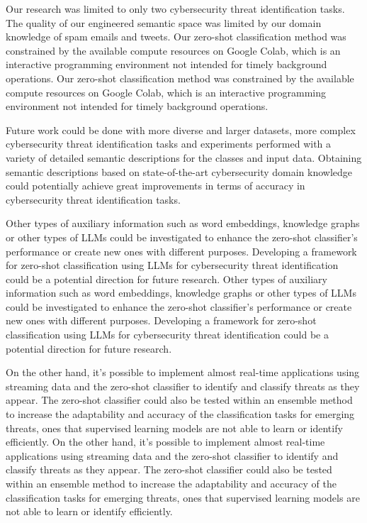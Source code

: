 \documentclass[letterpaper,twocolumn,fleqn]{article}
\begin{document}
Our research was limited to only two cybersecurity threat identification tasks. The quality of our engineered semantic space was limited by our domain knowledge of spam emails and tweets. 
Our zero-shot classification method was constrained by the available compute resources on Google Colab, which is an interactive programming environment not intended for timely background operations. 
Our zero-shot classification method was constrained by the available compute resources on Google Colab, which is an interactive programming environment not intended for timely background operations. 

Future work could be done with more diverse and larger datasets, more complex cybersecurity threat identification tasks and experiments performed with a variety of detailed semantic descriptions for the classes and input data. Obtaining semantic descriptions based on state-of-the-art cybersecurity domain knowledge could potentially achieve great improvements in terms of accuracy in cybersecurity threat identification tasks.

Other types of auxiliary information such as word embeddings, knowledge graphs or other types of LLMs could be investigated to enhance the zero-shot classifier's performance or create new ones with different purposes. Developing a framework for zero-shot classification using LLMs for cybersecurity threat identification could be a potential direction for future research.
Other types of auxiliary information such as word embeddings, knowledge graphs or other types of LLMs could be investigated to enhance the zero-shot classifier's performance or create new ones with different purposes. Developing a framework for zero-shot classification using LLMs for cybersecurity threat identification could be a potential direction for future research.

On the other hand, it's possible to implement almost real-time applications using streaming data and the zero-shot classifier to identify and classify threats as they appear. The zero-shot classifier could also be tested within an ensemble method to increase the adaptability and accuracy of the classification tasks for emerging threats, ones that supervised learning models are not able to learn or identify efficiently.
On the other hand, it's possible to implement almost real-time applications using streaming data and the zero-shot classifier to identify and classify threats as they appear. The zero-shot classifier could also be tested within an ensemble method to increase the adaptability and accuracy of the classification tasks for emerging threats, ones that supervised learning models are not able to learn or identify efficiently.
\end{document}
